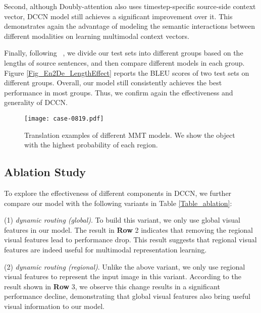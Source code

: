 \documentclass[sigconf]{acmart}
\begin{document}
Second, although Doubly-attention also uses timestep-specific source-side context vector, DCCN model still achieves a significant improvement over it. This demonstrates again the advantage of modeling the semantic interactions between different modalities on learning multimodal context vectors. 






Finally, following \citeauthor{rnn}~, 
we divide our test sets into different groups based on the lengths of source sentences, 
and then compare different models in each group.
Figure \ref{Fig_En2De_LengthEffect} reports the BLEU scores of two test sets on different groups. 
Overall, our model still consistently achieves the best performance in most groups. 
Thus, we confirm again the effectiveness and generality of DCCN. 





\begin{figure*}[!t]
\centering
\texttt{[image: case-0819.pdf]}
\caption{
\label{case}
Translation examples of different MMT models. We show the object with the highest probability of each region.}
\end{figure*}




\subsection{Ablation Study}

To explore the effectiveness of different components in DCCN, we further compare our model with the following variants in Table \ref{Table_ablation}: 

(1) \emph{dynamic routing (global)}.
To build this variant, 
we only use global visual features in our model. 
The result in \textbf{Row} 2 indicates that removing the regional visual features lead to performance drop. This result suggests that regional visual features are indeed useful for multimodal representation learning.

(2) \emph{dynamic routing (regional)}.
Unlike the above variant, 
we only use regional visual features to represent the input image in this variant.
According to the result shown in \textbf{Row} 3, 
we observe this change results in a significant performance decline, 
demonstrating that global visual features also bring useful visual information to our model.
\end{document}

